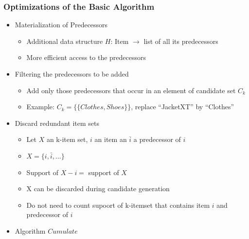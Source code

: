 \documentclass{article}
\begin{document}
\subsubsection{Optimizations of the Basic Algorithm}
\begin{itemize}
  \item Materialization of Predecessors
  \begin{itemize}
    \item Additional data structure $H$: Item $\rightarrow$ list of all its predecessors
    \item More efficient access to the predecessors 
  \end{itemize}

  \item Filtering the predecessors to be added
  \begin{itemize}
    \item Add only those predecessors that occur in an element of candidate set $C_k$
    \item Example: $C_k = \{\{Clothes, Shoes\}\}$, replace ``JacketXT'' by ``Clothes''
  \end{itemize}

  \item Discard redundant item sets
  \begin{itemize}
    \item Let $X$ an k-item set, $i$ an item an $\bar{i}$ a predecessor of $i$
    \item $X = \{i, \bar{i}, ...\}$
    \item Support of $X - {i} = $ support of $X$
    \item X can be discarded during candidate generation
    \item Do not need to count supoort of k-itemset that contains item $i$ and predecessor of $i$
  \end{itemize} 

  \item Algorithm $Cumulate$
\end{itemize} 
\end{document}
